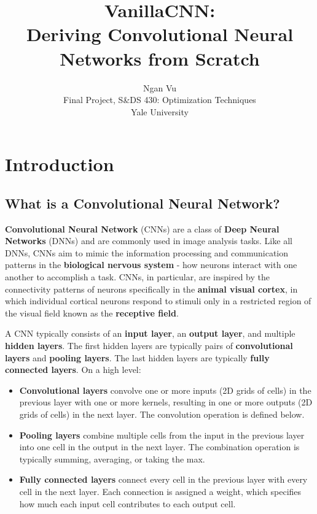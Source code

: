 \documentclass[12pt]{article}
\title{VanillaCNN:\\Deriving Convolutional Neural Networks from Scratch}
\author{Ngan Vu \\ Final Project, S\&DS 430: Optimization Techniques \\ Yale University}
\begin{document}
\maketitle
\tableofcontents

\section{Introduction}
\subsection{What is a Convolutional Neural Network?}
\textbf{Convolutional Neural Network} (CNNs) are a class of \textbf{Deep Neural Networks} (DNNs) and are commonly used in image analysis tasks. Like all DNNs, CNNs aim to mimic the information processing and communication patterns in the \textbf{biological nervous system} - how neurons interact with one another to accomplish a task. CNNs, in particular, are inspired by the connectivity patterns of neurons specifically in the \textbf{animal visual cortex}, in which individual cortical neurons respond to stimuli only in a restricted region of the visual field known as the \textbf{receptive field}.

A CNN typically consists of an \textbf{input layer}, an \textbf{output layer}, and multiple \textbf{hidden layers}. The first hidden layers are typically pairs of \textbf{convolutional layers} and \textbf{pooling layers}. The last hidden layers are typically \textbf{fully connected layers}. On a high level:
\begin{itemize}
    \item \textbf{Convolutional layers} convolve one or more inputs (2D grids of cells) in the previous layer with one or more kernels, resulting in one or more outputs (2D grids of cells) in the next layer. The convolution operation is defined below.
    \item \textbf{Pooling layers} combine multiple cells from the input in the previous layer into one cell in the output in the next layer. The combination operation is typically summing, averaging, or taking the max.
    \item \textbf{Fully connected layers} connect every cell in the previous layer with every cell in the next layer. Each connection is assigned a weight, which specifies how much each input cell contributes to each output cell.
\end{itemize}
\end{document}

